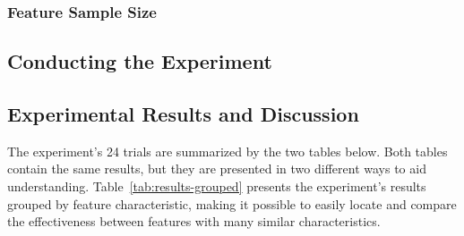 \subsubsection{Feature Sample Size}

\subsection{Conducting the Experiment}

\subsection{Experimental Results and Discussion}

The experiment's 24 trials are summarized by the two tables below.
Both tables contain the same results, but they are presented in two different ways to aid understanding.
Table~\ref{tab:results-grouped} presents the experiment's results grouped by feature characteristic, making it possible to easily locate and compare the effectiveness between features with many similar characteristics.


